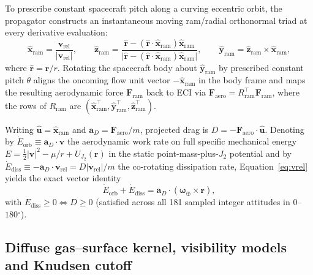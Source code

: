 \documentclass[12pt]{article}
\newcommand{\degree}{\ensuremath{{}^\circ}}
\begin{document}
To prescribe constant spacecraft pitch along a curving eccentric orbit, the propagator constructs an instantaneous moving ram/radial orthonormal triad at every derivative evaluation:
\begin{equation}
\hat{\mathbf{x}}_{\mathrm{ram}} = \frac{\mathbf{v}_{\mathrm{rel}}}{|\mathbf{v}_{\mathrm{rel}}|},\qquad
\hat{\mathbf{z}}_{\mathrm{ram}} = \frac{\hat{\mathbf{r}} - (\hat{\mathbf{r}}\cdot\hat{\mathbf{x}}_{\mathrm{ram}})\hat{\mathbf{x}}_{\mathrm{ram}}}{\bigl|\hat{\mathbf{r}} - (\hat{\mathbf{r}}\cdot\hat{\mathbf{x}}_{\mathrm{ram}})\hat{\mathbf{x}}_{\mathrm{ram}}\bigr|},\qquad
\hat{\mathbf{y}}_{\mathrm{ram}} = \hat{\mathbf{z}}_{\mathrm{ram}} \times \hat{\mathbf{x}}_{\mathrm{ram}},
\label{eq:ram-frame}
\end{equation}
where $\hat{\mathbf{r}} = \mathbf{r}/r$. Rotating the spacecraft body about $\hat{\mathbf{y}}_{\mathrm{ram}}$ by prescribed constant pitch $\theta$ aligns the oncoming flow unit vector $-\hat{\mathbf{x}}_{\mathrm{ram}}$ in the body frame and maps the resulting aerodynamic force $\mathbf{F}_{\mathrm{ram}}$ back to ECI via $\mathbf{F}_{\mathrm{aero}} = R_{\mathrm{ram}}^\top \mathbf{F}_{\mathrm{ram}}$, where the rows of $R_{\mathrm{ram}}$ are $(\hat{\mathbf{x}}_{\mathrm{ram}}^\top, \hat{\mathbf{y}}_{\mathrm{ram}}^\top, \hat{\mathbf{z}}_{\mathrm{ram}}^\top)$.

Writing $\hat{\mathbf{u}} = \hat{\mathbf{x}}_{\mathrm{ram}}$ and $\mathbf{a}_D = \mathbf{F}_{\mathrm{aero}}/m$, projected drag is $D = -\mathbf{F}_{\mathrm{aero}}\cdot\hat{\mathbf{u}}$. Denoting by $\dot{E}_{\mathrm{orb}} \equiv \mathbf{a}_D\cdot\mathbf{v}$ the aerodynamic work rate on full specific mechanical energy $E = \tfrac12|\mathbf{v}|^2 - \mu/r + U_{J_2}(\mathbf{r})$ in the static point-mass-plus-$J_2$ potential and by $\dot{E}_{\mathrm{diss}} \equiv -\mathbf{a}_D\cdot\mathbf{v}_{\mathrm{rel}} = D|\mathbf{v}_{\mathrm{rel}}|/m$ the co-rotating dissipation rate, Equation~\eqref{eq:vrel} yields the exact vector identity
\begin{equation}
\dot{E}_{\mathrm{orb}} + \dot{E}_{\mathrm{diss}}
  = \mathbf{a}_D\cdot(\boldsymbol{\omega}_\oplus\times\mathbf{r}),
\label{eq:energyidentity}
\end{equation}
with $\dot{E}_{\mathrm{diss}} \ge 0 \iff D \ge 0$ (satisfied across all 181 sampled integer attitudes in $0$--$180\degree$).

\subsection{Diffuse gas--surface kernel, visibility models and Knudsen cutoff}
\label{sec:sentman}
\label{sec:regime}
\label{sec:proxy}
\end{document}
